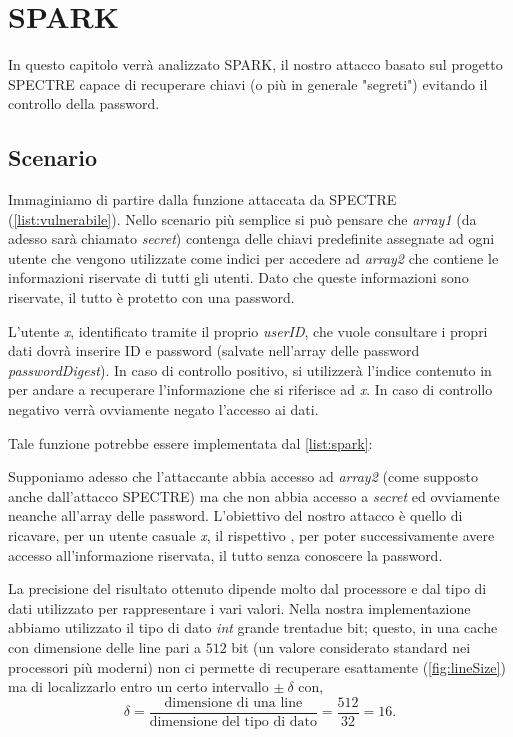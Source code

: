 \chapter{SPARK}
	In questo capitolo verrà analizzato \ac{SPARK}, il nostro attacco basato sul progetto SPECTRE capace di recuperare chiavi (o più in generale "segreti") evitando il controllo della password.
	
	\section{Scenario}
		Immaginiamo di partire dalla funzione attaccata da SPECTRE (\cref{list:vulnerabile}). Nello scenario più semplice si può pensare che \emph{array1} (da adesso sarà chiamato \emph{secret}) contenga delle chiavi predefinite assegnate ad ogni utente che vengono utilizzate come indici  per accedere ad \emph{array2} che contiene le informazioni riservate di tutti gli utenti. Dato che queste informazioni sono riservate, il tutto è protetto con una password. 
		
		L'utente \emph{x}, identificato tramite il proprio \emph{userID}, che vuole consultare i propri dati dovrà inserire ID e password (salvate nell'array delle password \emph{passwordDigest}). In caso di controllo positivo, si utilizzerà l'indice contenuto in  per andare a recuperare l'informazione che si riferisce ad \emph{x}. In caso di controllo negativo verrà ovviamente negato l'accesso ai dati.
		
		Tale funzione potrebbe essere implementata dal \cref{list:spark}:
		
		Supponiamo adesso che l'attaccante abbia accesso ad \emph{array2} (come supposto anche dall'attacco SPECTRE) ma che non abbia accesso a \emph{secret} ed ovviamente neanche all'array delle password. L'obiettivo del nostro attacco è quello di ricavare, per un utente casuale \emph{x}, il rispettivo , per poter successivamente avere accesso all'informazione riservata, il tutto senza conoscere la password.
		
		La precisione del risultato ottenuto dipende molto dal processore e dal tipo di dati utilizzato per rappresentare i vari valori. Nella nostra implementazione abbiamo utilizzato il tipo di dato \emph{int} grande trentadue bit; questo, in una cache con dimensione delle line pari a $512$ bit (un valore considerato standard nei processori più moderni) non ci permette di recuperare esattamente  (\cref{fig:lineSize}) ma di localizzarlo entro un certo intervallo  $\pm \ \delta$ con, $$\delta = \frac{\text{dimensione di una line}}{\text{dimensione del tipo di dato}} = \frac{512}{32} = 16.$$
		
